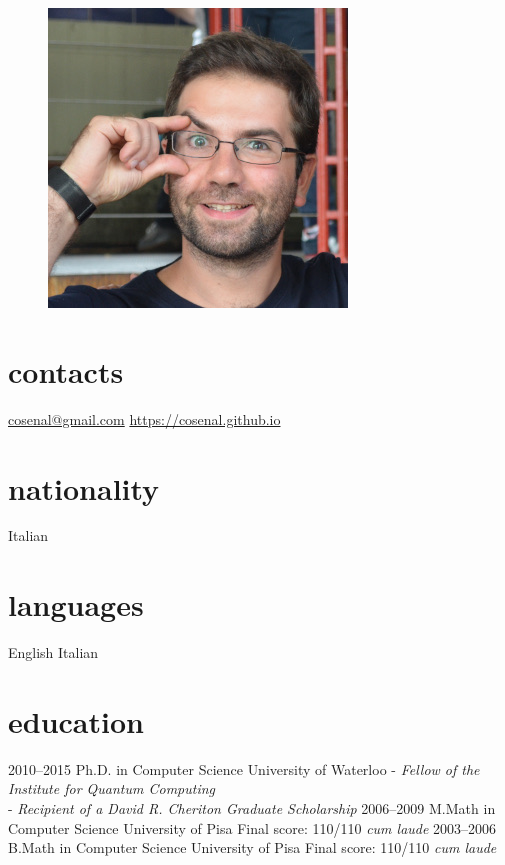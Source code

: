 \documentclass[]{friggeri-cv}
\begin{document}
\begin{aside}
    \begin{figure}\includegraphics[width=\linewidth]{avatar.jpg}\end{figure}\section{contacts}
    \href{mailto:cosenal@gmail.com}{cosenal@gmail.com}
    \href{https://cosenal.github.io}{https://cosenal.github.io}
  \section{nationality}
    Italian
  \section{languages}
    English
    Italian
\end{aside}

\section{education}
\begin{entrylist}
  \entry
    {2010–2015}
    {Ph.D. {\normalfont in Computer Science}}
    {University of Waterloo}
    {- \emph{Fellow of the Institute for Quantum Computing}\\
     - \emph{Recipient of a David R. Cheriton Graduate Scholarship}}
  \entry
    {2006–2009}
    {M.Math {\normalfont in Computer Science}}
    {University of Pisa}
    {Final score: 110/110 \emph{cum laude}}
  \entry
    {2003–2006}
    {B.Math {\normalfont in Computer Science}}
    {University of Pisa}
    {Final score: 110/110 \emph{cum laude}}
\end{entrylist}
\end{document}

